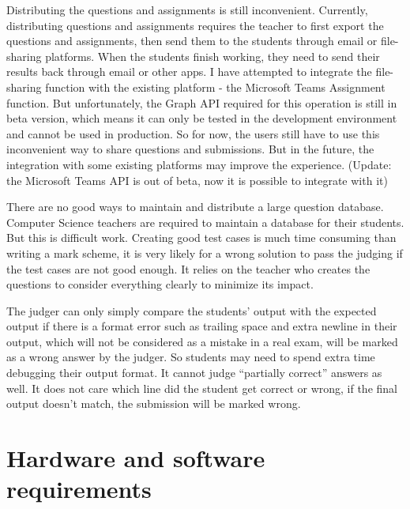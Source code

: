 \documentclass[a4paper]{report}
\begin{document}
Distributing the questions and assignments is still inconvenient. Currently, distributing questions and assignments requires the teacher to first export the questions and assignments, then send them to the students through email or file-sharing platforms. When the students finish working, they need to send their results back through email or other apps. I have attempted to integrate the file-sharing function with the existing platform - the Microsoft Teams Assignment function. But unfortunately, the Graph API required for this operation is still in beta version, which means it can only be tested in the development environment and cannot be used in production. So for now, the users still have to use this inconvenient way to share questions and submissions. But in the future, the integration with some existing platforms may improve the experience. (Update: the Microsoft Teams API is out of beta, now it is possible to integrate with it)

There are no good ways to maintain and distribute a large question database. Computer Science teachers are required to maintain a database for their students. But this is difficult work. Creating good test cases is much time consuming than writing a mark scheme, it is very likely for a wrong solution to pass the judging if the test cases are not good enough. It relies on the teacher who creates the questions to consider everything clearly to minimize its impact.

The judger can only simply compare the students' output with the expected output if there is a format error such as trailing space and extra newline in their output, which will not be considered as a mistake in a real exam, will be marked as a wrong answer by the judger. So students may need to spend extra time debugging their output format. It cannot judge ``partially correct'' answers as well. It does not care which line did the student get correct or wrong, if the final output doesn't match, the submission will be marked wrong.

\section{Hardware and software requirements}
\end{document}
